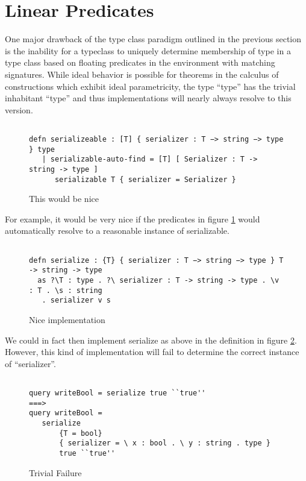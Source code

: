 \section{Linear Predicates}

One major drawback of the type class paradigm outlined in the previous section is the
inability for a typeclass to uniquely determine membership of type in a type class based
on floating predicates in the environment with matching signatures. While ideal behavior
is possible for theorems in the calculus of constructions which exhibit ideal parametricity,
the type “type” has the trivial inhabitant “type” and thus implementations
will nearly always resolve to this version.

\begin{figure}[H]
\begin{lstlisting}

defn serializeable : [T] { serializer : T −> string −> type } type
   | serializable-auto-find = [T] [ Serializer : T -> string -> type ]
      serializable T { serializer = Serializer }

\end{lstlisting}
\caption{This would be nice}
\label{lin:nice}
\end{figure}

For example, it would be very nice if the predicates in figure \ref{lin:nice} would automatically
resolve to a reasonable instance of serializable.

\begin{figure}[H]
\begin{lstlisting}

defn serialize : {T} { serializer : T −> string −> type } T -> string -> type
  as ?\T : type . ?\ serializer : T -> string -> type . \v : T . \s : string 
   . serializer v s

\end{lstlisting}
\caption{Nice implementation}
\label{lin:imp}
\end{figure}

We could in fact then implement serialize as above in the definition in figure \ref{lin:imp}.
However, this kind of implementation will fail to determine the correct instance of ``serializer''.


\begin{figure}[H]
\begin{lstlisting}

query writeBool = serialize true ``true''
===>
query writeBool = 
   serialize 
       {T = bool}
       { serializer = \ x : bool . \ y : string . type } 
       true ``true''

\end{lstlisting}
\caption{Trivial Failure}
\label{lin:fail}
\end{figure}

